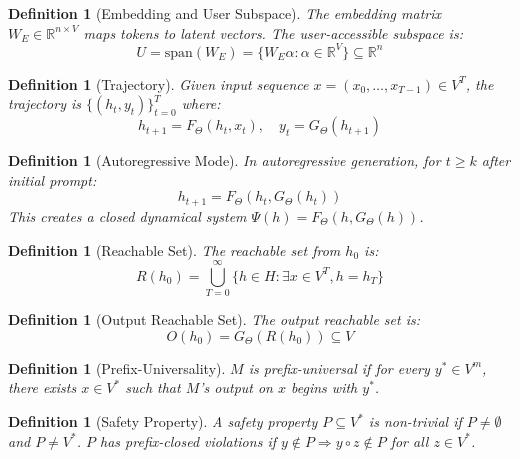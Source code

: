 \documentclass[11pt,a4paper]{article}
\newtheorem{definition}[theorem]{Definition}
\begin{document}
\begin{definition}[Embedding and User Subspace]
The embedding matrix $W_E \in \mathbb{R}^{n \times V}$ maps tokens to latent vectors. The user-accessible subspace is:
\begin{equation}
U = \text{span}(W_E) = \{W_E \alpha : \alpha \in \mathbb{R}^V\} \subseteq \mathbb{R}^n
\end{equation}
\end{definition}

\begin{definition}[Trajectory]
Given input sequence $x = (x_0, \ldots, x_{T-1}) \in V^T$, the trajectory is $\{(h_t, y_t)\}_{t=0}^T$ where:
\begin{equation}
h_{t+1} = F_\Theta(h_t, x_t), \quad y_t = G_\Theta(h_{t+1})
\end{equation}
\end{definition}

\begin{definition}[Autoregressive Mode]
In autoregressive generation, for $t \geq k$ after initial prompt:
\begin{equation}
h_{t+1} = F_\Theta(h_t, G_\Theta(h_t))
\end{equation}
This creates a closed dynamical system $\Psi(h) = F_\Theta(h, G_\Theta(h))$.
\end{definition}

\begin{definition}[Reachable Set]
The reachable set from $h_0$ is:
\begin{equation}
R(h_0) = \bigcup_{T=0}^{\infty} \{h \in H : \exists x \in V^T, h = h_T\}
\end{equation}
\end{definition}

\begin{definition}[Output Reachable Set]
The output reachable set is:
\begin{equation}
O(h_0) = G_\Theta(R(h_0)) \subseteq V
\end{equation}
\end{definition}

\begin{definition}[Prefix-Universality]
$M$ is prefix-universal if for every $y^* \in V^m$, there exists $x \in V^*$ such that $M$'s output on $x$ begins with $y^*$.
\end{definition}

\begin{definition}[Safety Property]
A safety property $P \subseteq V^*$ is non-trivial if $P \neq \emptyset$ and $P \neq V^*$. $P$ has prefix-closed violations if $y \notin P \Rightarrow y \circ z \notin P$ for all $z \in V^*$.
\end{definition}
\end{document}
